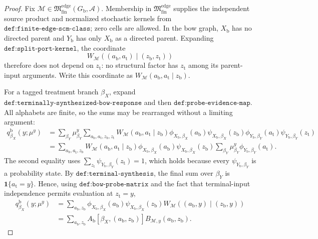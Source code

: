 \documentclass{article}
\begin{document}
\begin{proof}
Fix \(\mathcal M\in\mathfrak M_{\mathrm{fin}}^{\mathrm{edge}}(G_{\mathrm b},\mathcal A)\).  Membership in \(\mathfrak M_{\mathrm{fin}}^{\mathrm{edge}}\) supplies the independent source product and normalized stochastic kernels from \(\texttt{def:finite-edge-scm-class}\); zero cells are allowed.  In the bow graph, \(X_{\mathrm b}\) has no directed parent and \(Y_{\mathrm b}\) has only \(X_{\mathrm b}\) as a directed parent.  Expanding \(\texttt{def:split-port-kernel}\), the coordinate
\[
W_{\mathcal M}((a_{\mathrm b},a_{\mathrm t})\mid(z_{\mathrm b},z_{\mathrm t}))
\]
therefore does not depend on \(z_{\mathrm t}\): no structural factor has \(z_{\mathrm t}\) among its parent-input arguments.  Write this coordinate as \(W_{\mathcal M}(a_{\mathrm b},a_{\mathrm t}\mid z_{\mathrm b})\).

For a tagged treatment branch \(\beta_X\), expand \(\texttt{def:terminally-synthesized-bow-response}\) and then \(\texttt{def:probe-evidence-map}\).  All alphabets are finite, so the sums may be rearranged without a limiting argument:
\[
\begin{aligned}
q^{\mathrm b}_{\beta_X}(y;\mu^y)
&=\sum_{\beta_Y}\mu^y_{\beta_Y}
  \sum_{a_{\mathrm b},a_{\mathrm t},z_{\mathrm b},z_{\mathrm t}}
  W_{\mathcal M}(a_{\mathrm b},a_{\mathrm t}\mid z_{\mathrm b})
  \phi_{X_{\mathrm b},\beta_X}(a_{\mathrm b})
  \psi_{X_{\mathrm b},\beta_X}(z_{\mathrm b})
  \phi_{Y_{\mathrm b},\beta_Y}(a_{\mathrm t})
  \psi_{Y_{\mathrm b},\beta_Y}(z_{\mathrm t})\\
&=\sum_{a_{\mathrm b},a_{\mathrm t},z_{\mathrm b}}
  W_{\mathcal M}(a_{\mathrm b},a_{\mathrm t}\mid z_{\mathrm b})
  \phi_{X_{\mathrm b},\beta_X}(a_{\mathrm b})
  \psi_{X_{\mathrm b},\beta_X}(z_{\mathrm b})
  \sum_{\beta_Y}\mu^y_{\beta_Y}
  \phi_{Y_{\mathrm b},\beta_Y}(a_{\mathrm t}).
\end{aligned}
\]
The second equality uses \(\sum_{z_{\mathrm t}}\psi_{Y_{\mathrm b},\beta_Y}(z_{\mathrm t})=1\), which holds because every \(\psi_{Y_{\mathrm b},\beta_Y}\) is a probability state.  By \(\texttt{def:terminal-synthesis}\), the final sum over \(\beta_Y\) is \(\mathbf 1\{a_{\mathrm t}=y\}\).  Hence, using \(\texttt{def:bow-probe-matrix}\) and the fact that terminal-input independence permits evaluation at \(z_{\mathrm t}=y\),
\[
\begin{aligned}
q^{\mathrm b}_{\beta_X}(y;\mu^y)
&=\sum_{a_{\mathrm b},z_{\mathrm b}}
 \phi_{X_{\mathrm b},\beta_X}(a_{\mathrm b})
 \psi_{X_{\mathrm b},\beta_X}(z_{\mathrm b})
 W_{\mathcal M}((a_{\mathrm b},y)\mid(z_{\mathrm b},y))\\
&=\sum_{a_{\mathrm b},z_{\mathrm b}}
 A_{\mathrm b}[\beta_X,(a_{\mathrm b},z_{\mathrm b})]
 B_{\mathcal M,y}(a_{\mathrm b},z_{\mathrm b}).
\end{aligned}
\]


\end{proof}
\end{document}
